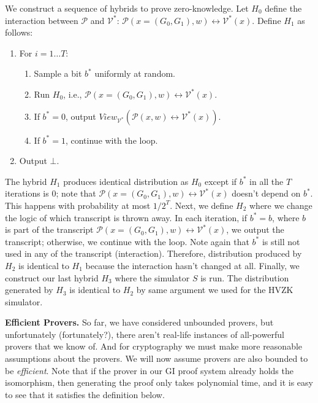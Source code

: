 \documentclass[12pt]{tufte-book}
\begin{document}
We construct a sequence of hybrids to prove zero-knowledge. Let $H_0$ define the interaction between $\mathcal{P}$ and $\mathcal{V^*}$: $\mathcal{P}(x=(G_0, G_1), w)\leftrightarrow \mathcal{V^*}(x)$. Define $H_1$ as follows: 
\begin{enumerate}
	\item For $i = 1\dots T$:
\begin{enumerate}
	\item Sample a bit $b^*$ uniformly at random.

	\item Run $H_0$, i.e., $\mathcal{P}(x=(G_0, G_1), w)\leftrightarrow \mathcal{V^*}(x)$.

	\item If $b^*=0$, output $View_{\mathcal{V^*}}(\mathcal{P}(x,w) \leftrightarrow \mathcal{V^*}(x))$.

	\item If $b^*=1$, continue with the loop.
\end{enumerate}
\item Output $\bot$.
\end{enumerate}

The hybrid $H_1$ produces identical distribution as $H_0$ except if $b^*$ in all the $T$ iterations is $0$; note that $\mathcal{P}(x=(G_0, G_1), w)\leftrightarrow \mathcal{V^*}(x)$ doesn't depend on $b^*$. This happens with probability at most $1/2^T$. Next, we define $H_2$ where we change the logic of which transcript is thrown away. In each iteration, if $b^* = b$, where $b$ is part of the transcript $\mathcal{P}(x=(G_0, G_1), w)\leftrightarrow \mathcal{V^*}(x)$, we output the transcript; otherwise, we continue with the loop. Note again that $b^*$ is still not used in any of the transcript (interaction). Therefore, distribution produced by $H_2$ is identical to $H_1$ because the interaction hasn't changed at all. Finally, we construct our last hybrid $H_3$ where the simulator $S$ is run. The distribution generated by $H_3$ is identical to $H_2$ by same argument we used for the HVZK simulator. \bigskip


\noindent\textbf{Efficient Provers.} So far, we have considered unbounded provers, but unfortunately (fortunately?), there aren't real-life instances of all-powerful provers that we know of. And for cryptography we must make more reasonable assumptions about the provers.  We will now assume provers are also bounded to be \emph{efficient}. Note that if the prover in our GI proof system already holds the isomorphism, then generating the proof only takes polynomial time, and it is easy to see that it satisfies the definition below. \smallskip
\end{document}
